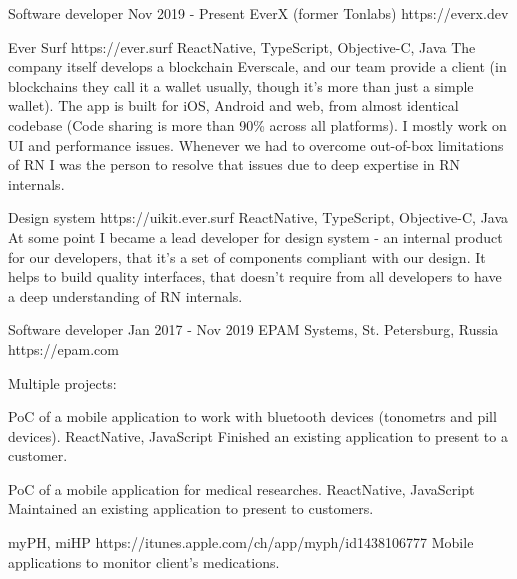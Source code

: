 \documentclass[11pt,a4paper,sans]{awesomecv}
\begin{document}
\begin{cventries}
\cventry
    {Software developer}
    {Nov 2019 - Present}
    {EverX (former Tonlabs)}
    {https://everx.dev}
    {
      \begin{cvprojects}{0.8ex}
      \item \cvproject
        {Ever Surf}
        {https://ever.surf}{}
        {ReactNative, TypeScript, Objective-C, Java}
        {
          The company itself develops a blockchain Everscale, and our team provide a client
          (in blockchains they call it a wallet usually, though it's more than just a simple wallet).
          The app is built for iOS, Android and web, from almost identical codebase (Code sharing is more than 90\% across all platforms).
          I mostly work on UI and performance issues.
          Whenever we had to overcome out-of-box limitations of RN 
          I was the person to resolve that issues due to deep expertise in RN internals.
        }
      \item \cvproject
        {Design system}
        {https://uikit.ever.surf}{}
        {ReactNative, TypeScript, Objective-C, Java}
        {
          At some point I became a lead developer for design system - an internal product for our developers,
          that it's a set of components compliant with our design.
          It helps to build quality interfaces, that doesn't require from all developers to have a deep understanding of RN internals.
        }
    \end{cvprojects}
    }
\cventry
    {Software developer}
    {Jan 2017 - Nov 2019}
    {EPAM Systems, St. Petersburg, Russia}
    {https://epam.com}
    {
      Multiple projects:\newline
      \begin{cvprojects}{0.8ex}
      \item \cvproject
          {PoC of a mobile application to work with bluetooth devices (tonometrs and pill devices).}
          {}{}
          {ReactNative, JavaScript}
          {Finished an existing application to present to a customer.}
      \item \cvproject
          {PoC of a mobile application for medical researches.}
          {}{}
          {ReactNative, JavaScript}
          {Maintained an existing application to present to customers.}
      \item \cvproject
          {myPH, miHP}
          {https://itunes.apple.com/ch/app/myph/id1438106777}
          {Mobile applications to monitor client's medications.}

\end{cvprojects}}
\end{cventries}
\end{document}

